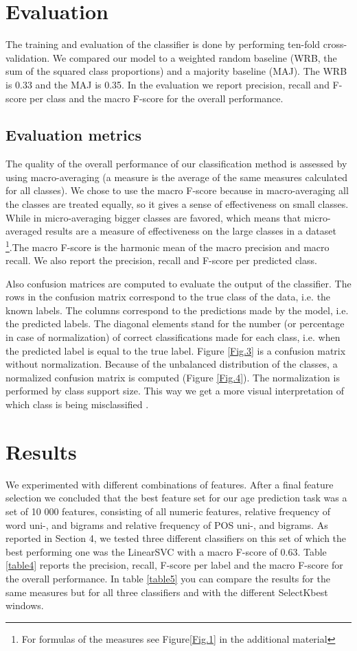 \documentclass{clv3}
\begin{document}
\section{Evaluation}
The training and evaluation of the classifier is done by performing ten-fold cross-validation. We compared our model to a weighted random baseline (WRB, the sum of the squared class proportions) and a majority baseline (MAJ). The WRB is 0.33 and the MAJ is 0.35. In the evaluation we report precision, recall and F-score per class and the macro F-score for the overall performance.
\subsection*{Evaluation metrics}
The quality of the overall performance of our classification method is assessed by using macro-averaging (a measure is the average of the same measures calculated for all classes). We chose to use the macro F-score because in macro-averaging all the classes are treated equally, so it gives a sense of effectiveness on small classes. While in micro-averaging bigger classes are favored, which means that micro-averaged results are a measure of effectiveness on the large classes in a dataset \citep{sokolova2009systematic}\footnote{For formulas of the measures see Figure\ref{Fig.1} in the additional material}.The macro F-score is the harmonic mean of the macro precision and macro recall. We also report the precision, recall and F-score per predicted class.

Also confusion matrices are computed to evaluate the output of the classifier. The rows in the confusion matrix correspond to the true class of the data, i.e. the known labels. The columns correspond to the predictions made by the model, i.e. the predicted labels. The diagonal elements stand for the number (or percentage in case of normalization) of correct classifications made for each class, i.e. when the predicted label is equal to the true label. Figure \ref{Fig.3} is a confusion matrix without normalization. Because of the unbalanced distribution of the classes, a normalized confusion matrix is computed (Figure \ref{Fig.4}). The normalization is performed by class support size. This way we get a more visual interpretation of which class is being misclassified \citep{pedregosa2011scikit}. 

\section{Results}
We experimented with different combinations of features. After a final feature selection we concluded that the best feature set for our age prediction task was a set of 10 000 features, consisting of all numeric features, relative frequency of word uni-, and bigrams and relative frequency of POS uni-, and bigrams. As reported in Section 4, we tested three different classifiers on this set of which the best performing one was the LinearSVC with a macro F-score of 0.63. Table \ref{table4} reports the precision, recall, F-score per label and the macro F-score for the overall performance. In table \ref{table5} you can compare the results for the same measures but for all three classifiers and with the different SelectKbest windows.
\end{document}

